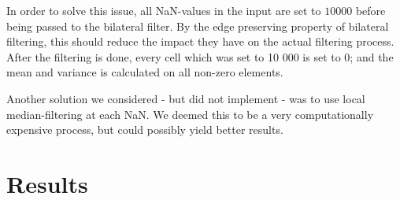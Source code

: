 \documentclass[11pt]{article}
\begin{document}
In order to solve this issue, all NaN-values in the input are set to $10000$ before being passed to the bilateral filter. By the edge preserving property of bilateral filtering, this should reduce the impact they have on the actual filtering process. After the filtering is done, every cell which was set to 10 000 is set to 0; and the mean and variance is calculated on all non-zero elements. \par
Another solution we considered - but did not implement - was to use local median-filtering at each NaN. We deemed this to be a very computationally expensive process, but could possibly yield better results. \par

\section{Results}


\end{document}
